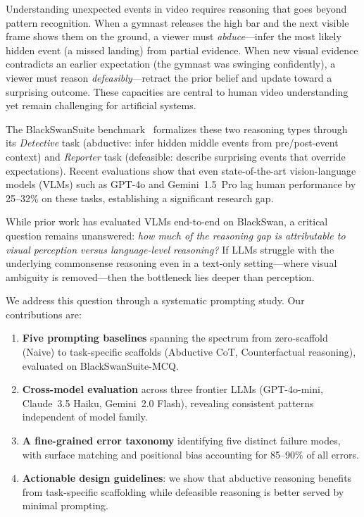 \documentclass[10pt,twocolumn,letterpaper]{article}
\begin{document}
Understanding unexpected events in video requires reasoning that goes beyond pattern recognition. When a gymnast releases the high bar and the next visible frame shows them on the ground, a viewer must \textit{abduce}---infer the most likely hidden event (a missed landing) from partial evidence. When new visual evidence contradicts an earlier expectation (the gymnast was swinging confidently), a viewer must reason \textit{defeasibly}---retract the prior belief and update toward a surprising outcome. These capacities are central to human video understanding yet remain challenging for artificial systems.

The BlackSwanSuite benchmark~\cite{chinchure2025black} formalizes these two reasoning types through its \textit{Detective} task (abductive: infer hidden middle events from pre/post-event context) and \textit{Reporter} task (defeasible: describe surprising events that override expectations). Recent evaluations show that even state-of-the-art vision-language models (VLMs) such as GPT-4o and Gemini~1.5~Pro lag human performance by 25--32\% on these tasks, establishing a significant research gap.

While prior work has evaluated VLMs end-to-end on BlackSwan, a critical question remains unanswered: \textit{how much of the reasoning gap is attributable to visual perception versus language-level reasoning?} If LLMs struggle with the underlying commonsense reasoning even in a text-only setting---where visual ambiguity is removed---then the bottleneck lies deeper than perception.

We address this question through a systematic prompting study. Our contributions are:

\begin{enumerate}[nosep,leftmargin=*]
\item \textbf{Five prompting baselines} spanning the spectrum from zero-scaffold (Naive) to task-specific scaffolds (Abductive CoT, Counterfactual reasoning), evaluated on BlackSwanSuite-MCQ.
\item \textbf{Cross-model evaluation} across three frontier LLMs (GPT-4o-mini, Claude~3.5 Haiku, Gemini~2.0 Flash), revealing consistent patterns independent of model family.
\item \textbf{A fine-grained error taxonomy} identifying five distinct failure modes, with surface matching and positional bias accounting for 85--90\% of all errors.
\item \textbf{Actionable design guidelines}: we show that abductive reasoning benefits from task-specific scaffolding while defeasible reasoning is better served by minimal prompting.
\end{enumerate}
\end{document}
